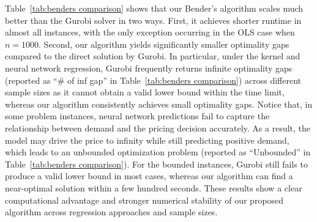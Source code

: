 \documentclass[onefignum,onetabnum]{siamart251216}
\begin{document}
Table\ \ref{tab:benders comparison} shows that our Bender's algorithm scales much better than the Gurobi solver in two ways.
First, it achieves shorter runtime in almost all instances, with the only exception occurring in the OLS case when $n=1000$. Second, our algorithm yields significantly smaller optimality gaps compared to the direct solution by Gurobi. In particular, under the kernel and neural network regression, Gurobi frequently returns infinite optimality gaps (reported as ``\# of inf gap'' in Table\ \ref{tab:benders comparison}) across different sample sizes as it cannot obtain a valid lower bound within the time limit, whereas our algorithm consistently achieves small optimality gaps. Notice that, in some problem instances, neural network predictions fail to capture the relationship between demand and the pricing decision accurately. As a result, the model may drive the price to infinity while still predicting positive demand, which leads to an unbounded optimization problem (reported as ``Unbounded'' in Table\ \ref{tab:benders comparison}). For the bounded instances, Gurobi still fails to produce a valid lower bound in most cases, whereas our algorithm can find a near-optimal solution within a few hundred seconds. These results show a clear computational advantage and stronger numerical stability of our proposed algorithm across regression approaches and sample sizes.

\vspace*{-0.01in}
\end{document}
